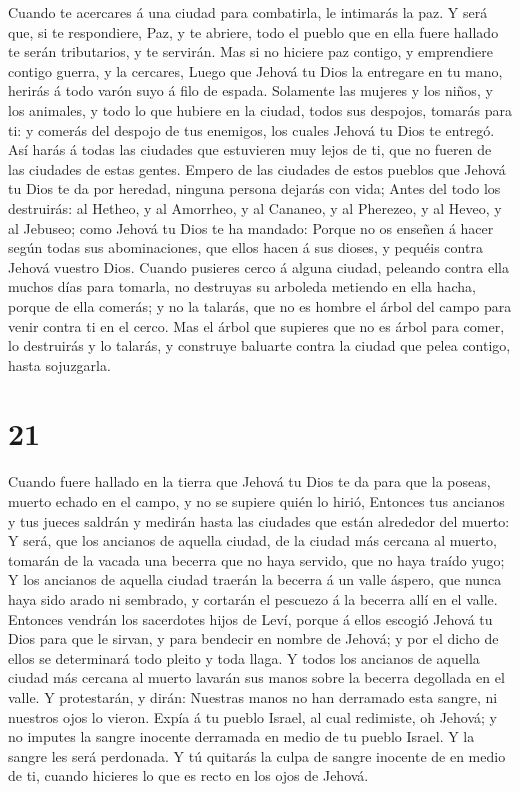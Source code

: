  Cuando te acercares á una ciudad para combatirla, le
intimarás la paz.  Y será que, si te respondiere, Paz, y te
abriere, todo el pueblo que en ella fuere hallado te serán tributarios,
y te servirán.  Mas si no hiciere paz contigo, y
emprendiere contigo guerra, y la cercares,  Luego que
Jehová tu Dios la entregare en tu mano, herirás á todo varón suyo á filo
de espada.  Solamente las mujeres y los niños, y los
animales, y todo lo que hubiere en la ciudad, todos sus despojos,
tomarás para ti: y comerás del despojo de tus enemigos, los cuales
Jehová tu Dios te entregó.  Así harás á todas las ciudades
que estuvieren muy lejos de ti, que no fueren de las ciudades de estas
gentes.  Empero de las ciudades de estos pueblos que Jehová
tu Dios te da por heredad, ninguna persona dejarás con vida;
 Antes del todo los destruirás: al Hetheo, y al Amorrheo, y
al Cananeo, y al Pherezeo, y al Heveo, y al Jebuseo; como Jehová tu Dios
te ha mandado:  Porque no os enseñen á hacer según todas
sus abominaciones, que ellos hacen á sus dioses, y pequéis contra Jehová
vuestro Dios.  Cuando pusieres cerco á alguna ciudad,
peleando contra ella muchos días para tomarla, no destruyas su arboleda
metiendo en ella hacha, porque de ella comerás; y no la talarás, que no
es hombre el árbol del campo para venir contra ti en el cerco.
 Mas el árbol que supieres que no es árbol para comer, lo
destruirás y lo talarás, y construye baluarte contra la ciudad que pelea
contigo, hasta sojuzgarla.

\hypertarget{section-20}{%
\section{21}\label{section-20}}

 Cuando fuere hallado en la tierra que Jehová tu Dios te da
para que la poseas, muerto echado en el campo, y no se supiere quién lo
hirió,  Entonces tus ancianos y tus jueces saldrán y medirán
hasta las ciudades que están alrededor del muerto:  Y será,
que los ancianos de aquella ciudad, de la ciudad más cercana al muerto,
tomarán de la vacada una becerra que no haya servido, que no haya traído
yugo;  Y los ancianos de aquella ciudad traerán la becerra á
un valle áspero, que nunca haya sido arado ni sembrado, y cortarán el
pescuezo á la becerra allí en el valle.  Entonces vendrán
los sacerdotes hijos de Leví, porque á ellos escogió Jehová tu Dios para
que le sirvan, y para bendecir en nombre de Jehová; y por el dicho de
ellos se determinará todo pleito y toda llaga.  Y todos los
ancianos de aquella ciudad más cercana al muerto lavarán sus manos sobre
la becerra degollada en el valle.  Y protestarán, y dirán:
Nuestras manos no han derramado esta sangre, ni nuestros ojos lo vieron.
 Expía á tu pueblo Israel, al cual redimiste, oh Jehová; y
no imputes la sangre inocente derramada en medio de tu pueblo Israel. Y
la sangre les será perdonada.  Y tú quitarás la culpa de
sangre inocente de en medio de ti, cuando hicieres lo que es recto en
los ojos de Jehová.

